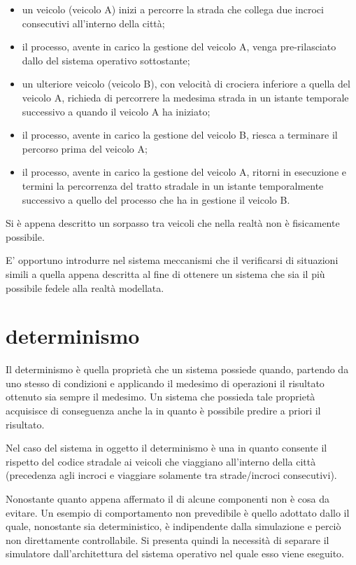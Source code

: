\begin{itemize}
\item{un veicolo (veicolo A) inizi a percorre la strada che collega due incroci consecutivi all'interno della città;}
\item{il processo, avente in carico la gestione del veicolo A, venga pre-rilasciato dallo  del sistema operativo sottostante;}
\item{un ulteriore veicolo (veicolo B), con velocità di crociera inferiore a quella del veicolo A, richieda di percorrere la medesima strada in un istante temporale successivo a quando il veicolo A ha iniziato;}
\item{il processo, avente in carico la gestione del veicolo B, riesca a terminare il percorso prima del veicolo A;}
\item{il processo, avente in carico la gestione del veicolo A, ritorni in esecuzione e termini la percorrenza del tratto stradale in un istante temporalmente successivo a quello del processo che ha in gestione il veicolo B.}
\end{itemize}

Si è appena descritto un sorpasso tra veicoli che nella realtà non è fisicamente possibile.

E' opportuno introdurre nel sistema meccanismi che  il verificarsi di situazioni simili a quella appena descritta al fine di ottenere un sistema che sia il più possibile fedele alla realtà modellata.

\section*{determinismo}
\label{problematiche_determinismo}
Il determinismo è quella proprietà che un sistema possiede quando, partendo da uno stesso  di condizioni e applicando il medesimo  di operazioni il risultato ottenuto sia sempre il medesimo. Un sistema che possieda tale proprietà acquisisce di conseguenza anche la  in quanto è possibile predire a priori il risultato.

Nel caso del sistema in oggetto il determinismo è una  in quanto consente il rispetto del codice stradale ai veicoli che viaggiano all'interno della città (precedenza agli incroci e viaggiare solamente tra strade/incroci consecutivi).

Nonostante quanto appena affermato il  di alcune componenti non è cosa da evitare. Un esempio di comportamento non prevedibile è quello adottato dallo  il quale, nonostante sia deterministico, è indipendente dalla simulazione e perciò non direttamente controllabile. Si presenta quindi la necessità di separare il simulatore dall'architettura del sistema operativo nel quale esso viene eseguito.

